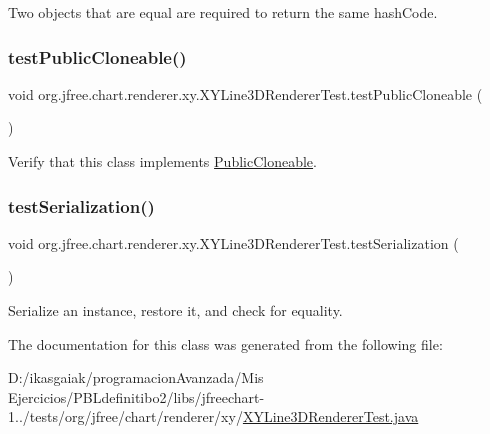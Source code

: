 Two objects that are equal are required to return the same hash\+Code. \mbox{\label{classorg_1_1jfree_1_1chart_1_1renderer_1_1xy_1_1_x_y_line3_d_renderer_test_a8b8a999bf2bfd0f4e91bf5654473d676}} 
\subsubsection{\texorpdfstring{test\+Public\+Cloneable()}{testPublicCloneable()}}
{\footnotesize\ttfamily void org.\+jfree.\+chart.\+renderer.\+xy.\+X\+Y\+Line3\+D\+Renderer\+Test.\+test\+Public\+Cloneable (\begin{DoxyParamCaption}{ }\end{DoxyParamCaption})}

Verify that this class implements \mbox{\hyperlink{}{Public\+Cloneable}}. \mbox{\label{classorg_1_1jfree_1_1chart_1_1renderer_1_1xy_1_1_x_y_line3_d_renderer_test_a5f1f9ee87ebb99822cf28de5c952c782}} 
\subsubsection{\texorpdfstring{test\+Serialization()}{testSerialization()}}
{\footnotesize\ttfamily void org.\+jfree.\+chart.\+renderer.\+xy.\+X\+Y\+Line3\+D\+Renderer\+Test.\+test\+Serialization (\begin{DoxyParamCaption}{ }\end{DoxyParamCaption})}

Serialize an instance, restore it, and check for equality. 

The documentation for this class was generated from the following file\+:\begin{DoxyCompactItemize}
\item 
D\+:/ikasgaiak/programacion\+Avanzada/\+Mis Ejercicios/\+P\+B\+Ldefinitibo2/libs/jfreechart-\/1../tests/org/jfree/chart/renderer/xy/\mbox{\hyperlink{_x_y_line3_d_renderer_test_8java}{X\+Y\+Line3\+D\+Renderer\+Test.\+java}}\end{DoxyCompactItemize}
